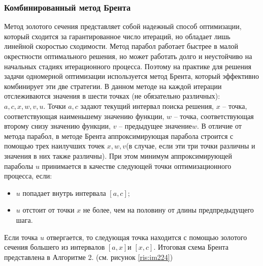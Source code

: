 \subsubsection{Комбинированный метод Брента}
Метод золотого сечения представляет собой надежный способ оптимизации, который сходится за гарантированное число итераций, но обладает лишь линейной скоростью сходимости. Метод парабол работает быстрее в малой окрестности оптимального решения, но может работать долго и неустойчиво на начальных стадиях итерационного процесса. Поэтому на практике для решения задачи одномерной оптимизации используется метод Брента, который эффективно комбинирует эти две стратегии.
\newline \newline В данном методе на каждой итерации отслеживаются значения в шести точках (не обязательно различных): $a, c, x, w, v, u$.
\newline \newline Точки $a, c$ задают текущий интервал поиска решения,
\newline $x$ – точка, соответствующая наименьшему значению функции,
\newline$ w $ – точка, соответствующая второму снизу значению функции,
\newline $v$ – предыдущее значение$ w$.
\newline \newline В отличие от метода парабол, в методе Брента аппроксимирующая парабола строится с помощью трех наилучших точек $x, w, v $(в случае, если эти три точки различны и значения в них также различны). При этом минимум аппроксимирующей параболы $u$ принимается в качестве следующей точки оптимизационного процесса, если:
\begin{itemize}
    \item $u$ попадает внутрь интервала $[a, c]$;
    \item $u$ отстоит от точки $x$ не более, чем на половину от длины предпредыдущего шага.
\end{itemize}
Если точка $u$ отвергается, то следующая точка находится с помощью золотого сечения большего из интервалов $[a, x] $и $[x, c]$. Итоговая схема Брента представлена в Алгоритме 2. (см. рисунок \ref{ris:im224})
